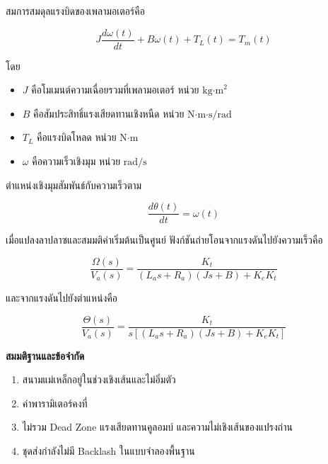 สมการสมดุลแรงบิดของเพลามอเตอร์คือ

\[
J\frac{d\omega(t)}{dt}+B\omega(t)+T_L(t)=T_m(t)
\]

โดย

\begin{itemize}
    \item $J$ คือโมเมนต์ความเฉื่อยรวมที่เพลามอเตอร์ หน่วย $\text{kg·m}^2$
    \item $B$ คือสัมประสิทธิ์แรงเสียดทานเชิงหนืด หน่วย $\text{N·m·s/rad}$
    \item $T_L$ คือแรงบิดโหลด หน่วย $\text{N·m}$
    \item $\omega$ คือความเร็วเชิงมุม หน่วย $\text{rad/s}$
\end{itemize}

ตำแหน่งเชิงมุมสัมพันธ์กับความเร็วตาม

\[
\frac{d\theta(t)}{dt}=\omega(t)
\]

เมื่อแปลงลาปลาซและสมมติค่าเริ่มต้นเป็นศูนย์ ฟังก์ชันถ่ายโอนจากแรงดันไปยังความเร็วคือ

\[
\frac{\Omega(s)}{V_a(s)}
=
\frac{K_t}
{(L_as+R_a)(Js+B)+K_eK_t}
\]

และจากแรงดันไปยังตำแหน่งคือ

\[
\frac{\Theta(s)}{V_a(s)}
=
\frac{K_t}
{s\left[(L_as+R_a)(Js+B)+K_eK_t\right]}
\]

\textbf{สมมติฐานและข้อจำกัด}

\begin{enumerate}
    \item สนามแม่เหล็กอยู่ในช่วงเชิงเส้นและไม่อิ่มตัว
    \item ค่าพารามิเตอร์คงที่
    \item ไม่รวม Dead Zone แรงเสียดทานคูลอมบ์ และความไม่เชิงเส้นของแปรงถ่าน
    \item ชุดส่งกำลังไม่มี Backlash ในแบบจำลองพื้นฐาน
\end{enumerate}


